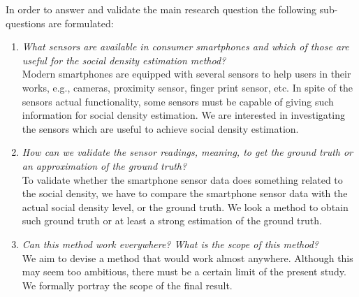 In order to answer and validate the main research question the following sub-questions are formulated:
\begin{enumerate}
	\item \textit{What sensors are available in consumer smartphones and which of those are useful for the social density estimation method?}\\
	Modern smartphones are equipped with several sensors to help users in their works, e.g., cameras, proximity sensor, finger print sensor, etc. In spite of the sensors actual functionality, some sensors must be capable of giving such information for social density estimation. We are interested in investigating the sensors which are useful to achieve social density estimation.

	\item \textit{How can we validate the sensor readings, meaning, to get the ground truth or an approximation of the ground truth?}\\
	To validate whether the smartphone sensor data does something related to the social density, we have to compare the smartphone sensor data with the actual social density level, or the ground truth. We look a method to obtain such ground truth or at least a strong estimation of the ground truth.


	\item \textit{Can this method work everywhere? What is the scope of this method?}\\
	We aim to devise a method that would work almost anywhere. Although this may seem too ambitious, there must be a certain limit of the present study. We formally portray the scope of the final result.
\end{enumerate}


